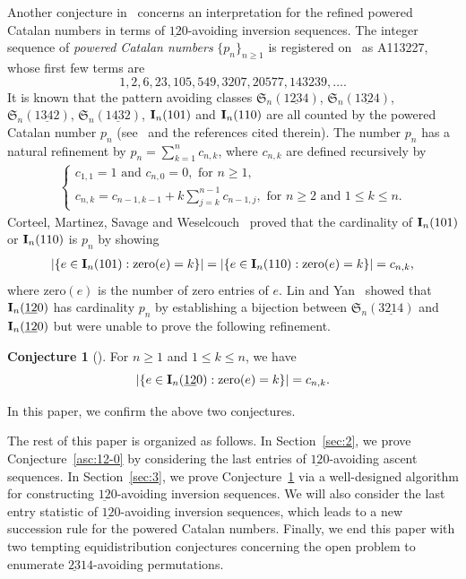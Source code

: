 \documentclass[12pt,A4]{amsart}
\numberwithin{equation}{section}
\theoremstyle{plain}
\theoremstyle{definition}
\newtheorem{conjecture}[theorem]{Conjecture}
\def\S{\mathfrak{S}}
\def\zero{\mathrm{zero}}
\def\I{\operatorname{{\bf I}}}
\begin{document}
Another conjecture in~\cite{ly} concerns an interpretation for the refined powered Catalan numbers in terms of $\underline{12}0$-avoiding inversion sequences.
The integer sequence of {\em powered Catalan numbers} $\{p_n\}_{n\geq1}$ is registered on~\cite{oeis} as A113227, whose first few terms are
$$
1,2,6,23,105,549,3207,20577,143239,\ldots.
$$
It is known that the pattern avoiding classes
$\S_n(1\underline{23}4)$, $\S_n(1\underline{32}4)$, $\S_n(1\underline{34}2)$, $\S_n(1\underline{43}2)$, $\I_n(101)$ and $\I_n(110)$ are all counted by the powered  Catalan number $p_n$ (see~\cite{bbgr,cor,ms} and the references cited therein).
The number $p_n$ has a natural refinement by $p_n=\sum_{k=1}^n c_{n,k}$, where $c_{n,k}$ are defined recursively by
\begin{align}\label{recurrence}
\begin{cases}
c_{1,1}=1\text{ and }c_{n,0}=0, \text{ for } n\ge 1,\\
c_{n,k}=c_{n-1,k-1}+k\sum_{j=k}^{n-1}c_{n-1,j}, \text{ for $n\geq2$ and $1\leq k\leq n$}.
\end{cases}
\end{align}
Corteel, Martinez,  Savage and  Weselcouch~\cite{cor} proved that the cardinality of $\I_n(101)$ or $\I_n(110)$ is $p_n$ by showing
\begin{align}\label{101=110 with zero}
|\{e\in\I_n(101):\zero(e)=k\}|=|\{e\in\I_n(110):\zero(e)=k\}|=c_{n,k},
\end{align}
where $\zero(e)$ is the number of zero entries of $e$. Lin and Yan~\cite{ly} showed that $\I_n(\underline{12}0)$ has cardinality $p_n$ by establishing a bijection between $\S_n(3\underline{21}4)$ and $\I_n(\underline{12}0)$ but were unable to prove the following refinement. 


\begin{conjecture}[]\label{inv:12-0}
For $n\ge 1$ and $1\leq k\leq n$, we have
$$
|\{e\in\I_n(\underline{12}0):\zero(e)=k\}|=c_{n,k}.
$$
\end{conjecture}

In this paper, we confirm the above two conjectures. 

The rest of this paper is organized as follows. In Section~\ref{sec:2}, we prove Conjecture~\ref{asc:12-0} by considering the last entries of $\underline{12}0$-avoiding ascent sequences. In Section~\ref{sec:3}, we prove Conjecture~\ref{inv:12-0} via a well-designed algorithm for constructing  $\underline{12}0$-avoiding inversion sequences. We will also consider the last entry statistic of $\underline{12}0$-avoiding inversion sequences, which leads to a new succession rule for the powered Catalan numbers.  Finally, we end this paper with two tempting  equidistribution conjectures concerning the open problem to enumerate  $\underline{23}14$-avoiding permutations.
\end{document}
